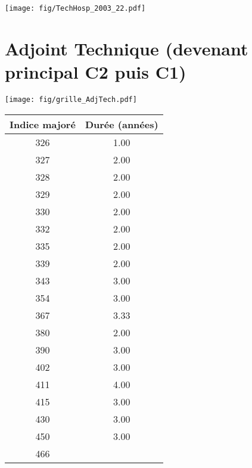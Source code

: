  \vspace{0.1cm} 

 \begin{center}\texttt{[image: fig/TechHosp\_2003\_22.pdf]}\end{center} \label{fig/TechHosp_2003_22.pdf} 

\newpage 
 
\chapter{Adjoint Technique (devenant principal C2 puis C1)} 

\begin{minipage}{0.55\linewidth}\texttt{[image: fig/grille\_AdjTech.pdf]}\end{minipage} 
\begin{minipage}{0.3\linewidth} 
 \begin{center} 

\begin{tabular}[htb]{|c|c|} 
\hline 
 Indice majoré &  Durée (années) \\ 
\hline \hline 
 326 &  1.00 \\ 
\hline 
 327 &  2.00 \\ 
\hline 
 328 &  2.00 \\ 
\hline 
 329 &  2.00 \\ 
\hline 
 330 &  2.00 \\ 
\hline 
 332 &  2.00 \\ 
\hline 
 335 &  2.00 \\ 
\hline 
 339 &  2.00 \\ 
\hline 
 343 &  3.00 \\ 
\hline 
 354 &  3.00 \\ 
\hline 
 367 &  3.33 \\ 
\hline 
 380 &  2.00 \\ 
\hline 
 390 &  3.00 \\ 
\hline 
 402 &  3.00 \\ 
\hline 
 411 &  4.00 \\ 
\hline 
 415 &  3.00 \\ 
\hline 
 430 &  3.00 \\ 
\hline 
 450 &  3.00 \\ 
\hline 
 466 &   \\ 
\hline 
\hline 
\end{tabular} 
\end{center} 
 \end{minipage} 


